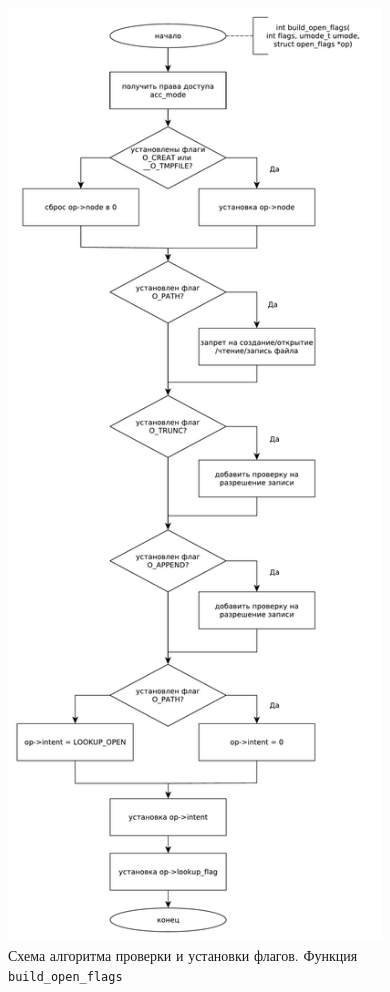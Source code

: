 \clearpage

\begin{figure}[h!btp]
	\centering
	\includegraphics[height=700pt]{inc/build_open_flags.pdf}
	\caption{Схема алгоритма проверки и установки флагов. Функция \texttt{build\_open\_flags}}
\end{figure}

\clearpage

